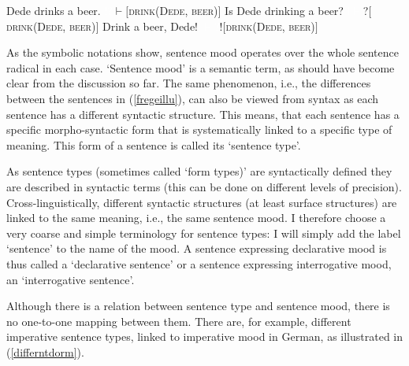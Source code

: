 \begin{exe}
\ex\label{fregeillu}\begin{xlist} 
\ex Dede drinks a beer. \hfill {\textcolor{white}{!?}$\vdash$$[$\textsc{drink}(\textsc{Dede}, \textsc{beer})$]$} \label{fregeillustrationa}
\ex Is Dede drinking a beer? \hfill {\textcolor{white}{!$\vdash$}?$[$\textsc{drink}(\textsc{Dede}, \textsc{beer})$]$} \label{fregeillustrationb}
\ex Drink a beer, Dede! \hfill {\textcolor{white}{$\vdash$?}!$[$\textsc{drink}(\textsc{Dede}, \textsc{beer})$]$} \label{fregeillustrationc}
\end{xlist}
\end{exe} 

\noindent As the symbolic notations show, sentence mood operates over the whole sentence radical in each case. `Sentence mood' is a semantic term, as should have become clear from the discussion so far. The same phenomenon, i.e., the differences between the sentences in (\ref{fregeillu}), can also be viewed from syntax as each sentence has a different syntactic structure. This means, that each sentence has a specific morpho-syntactic form that is systematically linked to a specific type of meaning. This form of a sentence is called its `sentence type'. 

As sentence types (sometimes called `form types)' are syntactically defined they are described in syntactic terms (this can be done on different levels of precision). Cross-linguistically, different syntactic structures (at least surface structures) are linked to the same meaning, i.e., the same sentence mood. I therefore choose a very coarse and simple terminology for sentence types: I will simply add the label `sentence' to the name of the mood. A sentence expressing declarative mood is thus called a `declarative sentence' or a sentence expressing interrogative mood, an `interrogative sentence'.

Although there is a relation between sentence type and sentence mood, there is no one-to-one mapping between them. There are, for example, different imperative sentence types, linked to imperative mood in German, as illustrated in (\ref{differntdorm}).


